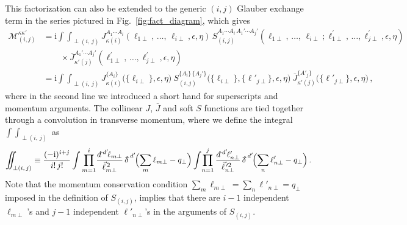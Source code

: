 \documentclass[letterpaper,11pt]{article}
\newcommand{\fig}[1]{Fig.~\ref{fig:#1}}
\newcommand{\img}{\mathrm{i}}
\newcommand{\cM}{\mathcal{M}}
\newcommand{\ddslash}{{d\!\!{}^-}}
\newcommand{\deltaslash}{{\delta\!\!\!{}^-}}
\newcommand{\nn}{\nonumber}
\newcommand{\IInt}{\int\!\!\!\!\!\int}
\begin{document}
This factorization can also be extended to the generic $(i,j)$ Glauber exchange term in the series pictured in \fig{fact_diagram}, which gives
\begin{align}\label{eq:fw_fact}
 \cM_{(i,j)}^{\kappa\kappa'}
 &=  
  \img \IInt_{\perp(i,\,j)}  
 J_{\kappa(i)}^{A_1\cdots A_i}( 
\ell_{1\perp},\, \dots, \, \ell_{i\perp},\epsilon,\eta)\, 
S_{(i,j)}^{A_1\cdots A_i\,A_1'\cdots A_j'}(\ell_{1\perp},\, \dots, \, \ell_{i\perp}; {\ell}^{\prime}_{1\perp} ,\, \dots , {\ell}^{\prime}_{j\perp},\epsilon,\eta)\, 
  \nn\\
 & \qquad\times {\bar J}_{\kappa' (j)}^{A_1'\cdots A_j'}({\ell}^{\prime}_{1\perp} ,\, \dots , {\ell}^{\prime}_{j\perp},\epsilon,\eta) 
  \, \nn\\
 &= \img \IInt_{\perp(i,\,j)}  
  J_{\kappa(i)}^{\{A_i\}}\bigl( \{\ell_{i\perp}\},\epsilon,\eta \bigr)\:
  S_{(i,j)}^{\{A_i\}\,\{A_j'\}}\bigl(\{\ell_{i\perp}\},\{\ell'_{j\perp}\},
   \epsilon,\eta\bigr)\:
  \bar J_{\kappa'(j)}^{\{A'_j\}}\bigl( \{\ell'_{j\perp}\},\epsilon,\eta \bigr)
  \,,
\end{align}
where in the second line we introduced a short hand for superscripts and momentum arguments.
The collinear $J$, $\bar J$ and soft $S$ functions are tied together through a convolution in transverse momentum, where we define the integral $\int\!\!\!\int_{\perp(i,\,j)}$ as
\begin{align} \label{eq:iint_perp}
  \IInt_{\perp(i,\,j)} 
  \equiv 
  \frac{(-\img)^{i+j}}{i!\, j!}
  \int \prod_{m=1}^{i}\! \frac{\ddslash\!^{d'}\!\ell_{m\perp}}{\vec\ell_{m\perp}^{\,2}} \, \deltaslash^{d'}\!\Bigl(\sum_m \ell_{m\perp}- q_\perp\Bigr) 
  \int\! \prod_{n=1}^{j} \frac{\ddslash\!^{d'}\!\ell'_{n\perp}}{{\vec\ell_{n\perp}^{\,\prime 2}}} \,  \deltaslash^{d'}\!\Bigl(\sum_n {\ell}^{\prime}_{n\perp}- q_\perp\Bigr) \,.
\end{align}
Note that the momentum conservation condition $\sum_m\ell_{m\perp}=\sum_n\ell'_{n\perp}=q_\perp$ imposed in the definition of $S_{(i,j)}$, 
implies that there are $i-1$ independent $\ell_{m\perp}$'s and $j-1$ independent $\ell'_{n\perp}$'s in the arguments of $S_{(i,j)}$. 
\end{document}
